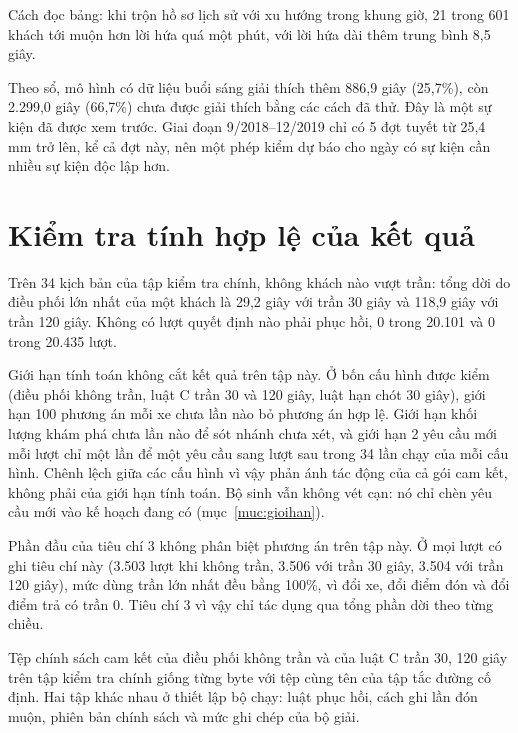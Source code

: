 Cách đọc bảng: khi trộn hồ sơ lịch sử với xu hướng trong khung giờ, 21 trong 601 khách tới muộn hơn lời hứa quá một
phút, với lời hứa dài thêm trung bình 8,5 giây.

Theo sổ, mô hình có dữ liệu buổi sáng giải thích thêm 886,9 giây (25,7\%), còn 2.299,0 giây (66,7\%) chưa được giải
thích bằng các cách đã thử. Đây là một sự kiện đã được xem trước. Giai đoạn 9/2018--12/2019 chỉ có 5 đợt tuyết từ
25,4 mm trở lên, kể cả đợt này, nên một phép kiểm dự báo cho ngày có sự kiện cần nhiều sự kiện độc lập hơn.

\section{Kiểm tra tính hợp lệ của kết quả}
\label{muc:c4-hople}

Trên 34 kịch bản của tập kiểm tra chính, không khách nào vượt trần: tổng dời do điều phối lớn nhất của một khách là
29,2 giây với trần 30 giây và 118,9 giây với trần 120 giây. Không có lượt quyết định nào phải phục hồi, 0 trong 20.101
và 0 trong 20.435 lượt.

Giới hạn tính toán không cắt kết quả trên tập này. Ở bốn cấu hình được kiểm (điều phối không trần, luật C trần 30 và
120 giây, luật hạn chót 30 giây), giới hạn 100 phương án mỗi xe chưa lần nào bỏ phương án hợp lệ. Giới hạn khối lượng
khám phá chưa lần nào để sót nhánh chưa xét, và giới hạn 2 yêu cầu mới mỗi lượt chỉ một lần để một yêu cầu sang lượt
sau trong 34 lần chạy của mỗi cấu hình. Chênh lệch giữa các cấu hình vì vậy phản ánh tác động của cả gói cam kết,
không phải của giới hạn tính toán. Bộ sinh vẫn không vét cạn: nó chỉ chèn yêu cầu mới vào kế hoạch đang có
(mục~\ref{muc:gioihan}).

Phần đầu của tiêu chí 3 không phân biệt phương án trên tập này. Ở mọi lượt có ghi tiêu chí này (3.503 lượt khi không
trần, 3.506 với trần 30 giây, 3.504 với trần 120 giây), mức dùng trần lớn nhất đều bằng 100\%, vì đổi xe, đổi điểm đón
và đổi điểm trả có trần 0. Tiêu chí 3 vì vậy chỉ tác dụng qua tổng phần dời theo từng chiều.

Tệp chính sách cam kết của điều phối không trần và của luật C trần 30, 120 giây trên tập kiểm tra chính giống từng
byte với tệp cùng tên của tập tắc đường cố định. Hai tập khác nhau ở thiết lập bộ chạy: luật phục hồi, cách ghi lần
đón muộn, phiên bản chính sách và mức ghi chép của bộ giải.

